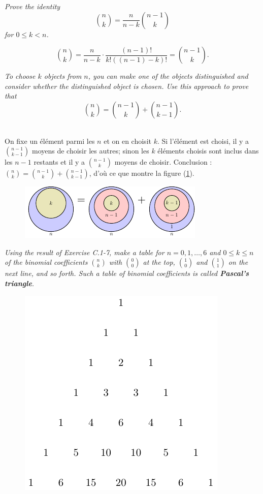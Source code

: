 \begin{description}
   {\itshape Prove the identity \[\binom{n}{k} = \frac{n}{n-k}\binom{n-1}{k}\] for $ 0 \le k < n$.}
    \begin{ex}
      \[ \binom{n}{k} = \frac{n}{n-k}\cdot\frac{(n-1)!}{k!((n-1)-k)!} = \binom{n-1}{k}.\]
    \end{ex}
   {\itshape To choose $k$ objects from $n$, you can make one of the objects distinguished and consider whether the distinguished object is chosen. Use this approach to prove that \[\binom{n}{k} = \binom{n-1}{k}+\binom{n-1}{k-1}.\]}
    \begin{ex}\mbox{}\\ %
      On fixe un \'el\'ement parmi les $n$ et on en choisit $k$. Si l'\'el\'ement est choisi, il y a $\binom{n-1}{k-1}$ moyens de choisir les autres; sinon les $k$ \'el\'ements choisis sont inclus dans les $n-1$ restants et il y a $\binom{n-1}{k}$ moyens de choisir.
    Conclusion : $ \binom{n}{k} = \binom{n-1}{k}+\binom{n-1}{k-1}$, d'o\`u ce que montre la figure (\ref{fig:C.1-7}).     
      {
        \begin{figure}[H]
          \centering
        \includegraphics[scale=1.5]{img/C_1-7/C_1-7.pdf}
        \caption{}
          \label{fig:C.1-7}
        \end{figure}
      }
    \end{ex}
   {\itshape Using the result of Exercise C.1-7, make a table for $n = 0, 1, \ldots, 6$ and $ 0\le k \le n$ of the binomial coefficients $\binom{n}{k}$ with $\binom{0}{0}$ at the top, $\binom{1}{0}$ and $\binom{1}{1}$ on the next line, and so forth. Such a table of binomial coefficients is called \textbf{Pascal’s triangle}.}
    \begin{ex}\mbox{}
      \begin{figure}[H]
        \centering
        \includegraphics{img/C_1-8/C_1-8.pdf}

\end{figure}
\end{ex}
\end{description}
